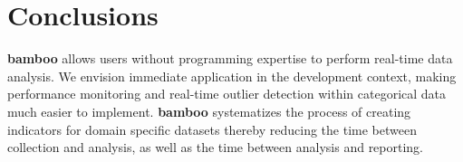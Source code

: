 \documentclass{sig-alternate}
\begin{document}
\section{Conclusions}
\textbf{bamboo} allows users without programming expertise to perform real-time
data analysis.
We envision immediate application in the development context, making performance
monitoring \cite{berg} and real-time outlier detection within categorical data \cite{dimagi} much easier to implement. 
\textbf{bamboo} systematizes the process of creating indicators for domain specific datasets thereby reducing the time between collection and analysis, as well as the time between analysis and reporting.


%

%
%

\balancecolumns
\end{document}
